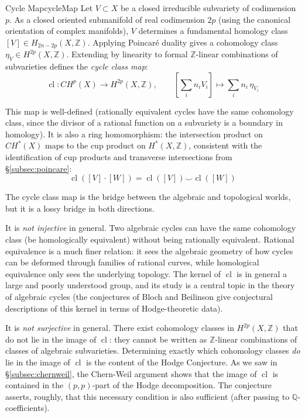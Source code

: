 \documentclass{article}
\newcommand{\Q}{\mathbb{Q}}
\newcommand{\Z}{{\mathbb{Z}}}
\newcommand{\cl}{\operatorname{cl}}
\begin{document}
\begin{defn}{Cycle Map}{cycleMap}
  Let $V \subset X$ be a closed irreducible subvariety of codimension $p$. As a
closed oriented submanifold of real codimension $2p$ (using the canonical
orientation of complex manifolds), $V$ determines a fundamental homology class
$[V] \in H_{2n-2p}(X, \Z)$. Applying Poincar\'{e} duality gives a cohomology
class $\eta_V \in H^{2p}(X, \Z)$. Extending by linearity to formal
$\Z$-linear combinations of subvarieties defines the \emph{cycle class map}:
\[
  \cl: CH^p(X) \longrightarrow H^{2p}(X, \Z), \qquad
    \left[\sum_i n_i V_i\right] \longmapsto \sum_i n_i\, \eta_{V_i}
\]
\end{defn}


This map is well-defined (rationally equivalent cycles have the same cohomology
class, since the divisor of a rational function on a subvariety is a boundary
in homology). It is also a ring homomorphism: the intersection product on
$CH^*(X)$ maps to the cup product on $H^*(X, \Z)$, consistent with the
identification of cup products and transverse intersections from
\S\ref{subsec:poincare}:
\[
  \cl([V] \cdot [W]) = \cl([V]) \smile \cl([W])
\]

The cycle class map is the bridge between the algebraic and topological worlds,
but it is a lossy bridge in both directions.

It is \emph{not injective} in general. Two algebraic cycles can have the same
cohomology class (be homologically equivalent) without being rationally
equivalent. Rational equivalence is a much finer relation: it sees the
algebraic geometry of how cycles can be deformed through families of rational
curves, while homological equivalence only sees the underlying topology. The
kernel of $\cl$ is in general a large and poorly understood group, and its
study is a central topic in the theory of algebraic cycles (the conjectures of
Bloch and Beilinson give conjectural descriptions of this kernel in terms of
Hodge-theoretic data).

It is \emph{not surjective} in general. There exist cohomology classes in
$H^{2p}(X, \Z)$ that do not lie in the image of $\cl$: they cannot be written
as $\Z$-linear combinations of classes of algebraic subvarieties. Determining
exactly which cohomology classes \emph{do} lie in the image of $\cl$ is the
content of the Hodge Conjecture. As we saw in \S\ref{subsec:chernweil}, the
Chern-Weil argument shows that the image of $\cl$ is contained in the
$(p,p)$-part of the Hodge decomposition. The conjecture asserts, roughly, that
this necessary condition is also sufficient (after passing to $\Q$-coefficients).
\end{document}

